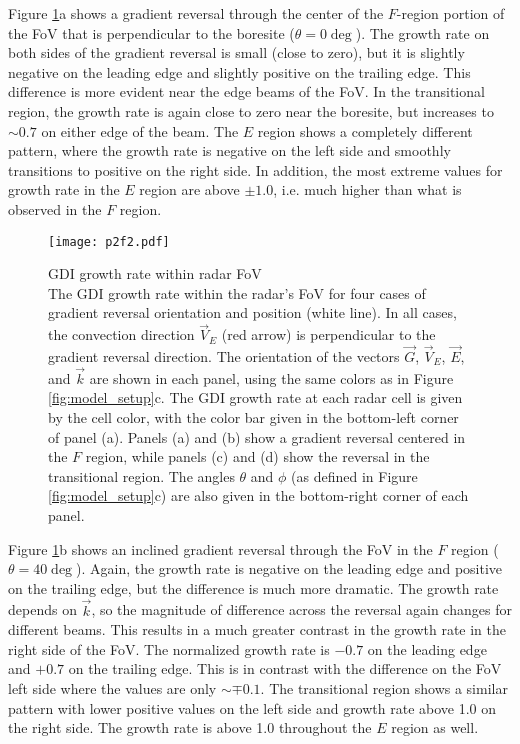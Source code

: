 Figure \ref{fig:fov_grs}a shows a gradient reversal through the center of the \(F\)-region portion of the FoV that is perpendicular to the boresite (\(\theta=0\deg\)).  The growth rate on both sides of the gradient reversal is small (close to zero), but it is slightly negative on the leading edge and slightly positive on the trailing edge. This difference is more evident near the edge beams of the FoV.  In the transitional region, the growth rate is again close to zero near the boresite, but increases to \(\sim0.7\) on either edge of the beam.  The \(E\) region shows a completely different pattern, where the growth rate is negative on the left side and smoothly transitions to positive on the right side.  In addition, the most extreme values for growth rate in the \(E\) region are above \(\pm1.0\), i.e. much higher than what is observed in the \(F\) region.

\begin{figure}
	\texttt{[image: p2f2.pdf]}
	\caption[GDI growth rate within radar FoV]{{\:}GDI growth rate within radar FoV\\ The GDI growth rate within the radar's FoV for four cases of gradient reversal orientation and position (white line).  In all cases, the convection direction \(\vec{V}_E\) (red arrow) is perpendicular to the gradient reversal direction.  The orientation of the vectors \(\vec{G}\), \(\vec{V}_E\), \(\vec{E}\), and \(\vec{k}\) are shown in each panel, using the same colors as in Figure \ref{fig:model_setup}c.  The GDI growth rate at each radar cell is given by the cell color, with the color bar given in the bottom-left corner of panel (a). Panels (a) and (b) show a gradient reversal centered in the \(F\) region, while panels (c) and (d) show the reversal in the transitional region.  The angles \(\theta\) and \(\phi\) (as defined in Figure \ref{fig:model_setup}c) are also given in the bottom-right corner of each panel.}
	\label{fig:fov_grs}
\end{figure}

Figure \ref{fig:fov_grs}b shows an inclined gradient reversal through the FoV in the \(F\) region (\(\theta=40\deg\)). Again, the growth rate is negative on the leading edge and positive on the trailing edge, but the difference is much more dramatic.  The growth rate depends on \(\vec{k}\), so the magnitude of difference across the reversal again changes for different beams. This results in a much greater contrast in the growth rate in the right side of the FoV. The normalized growth rate is \(-0.7\) on the leading edge and \(+0.7\) on the trailing edge. This is in contrast with the difference on the FoV left side where the values are only \(\sim\mp0.1\).  The transitional region shows a similar pattern with lower positive values on the left side and growth rate above 1.0 on the right side.  The growth rate is above 1.0 throughout the \(E\) region as well.

